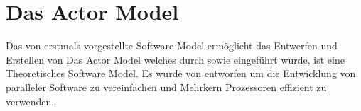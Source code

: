 \chapter{Das Actor Model}
Das von \cite{hewitt1973session} erstmals vorgestellte Software Model ermöglicht das Entwerfen und Erstellen von 
Das Actor Model welches durch \cite{hewitt1973session} sowie \cite{Agha1985ActorsSystems} eingeführt wurde, ist eine Theoretisches Software Model. 
Es wurde von \cite{hewitt1973session} entworfen um die Entwicklung von paralleler Software zu vereinfachen und Mehrkern Prozessoren effizient zu verwenden.